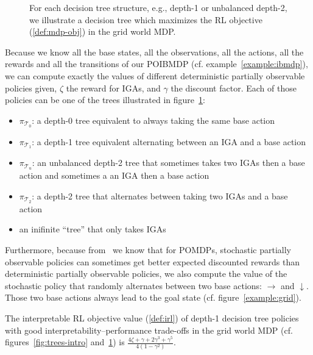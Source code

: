 \begin{figure}
    \caption{For each decision tree structure, e.g., depth-1 or unbalanced depth-2, we illustrate a decision tree which maximizes the RL objective (\ref{def:mdp-obj}) in the grid world MDP.}
    \label{fig:optimal-policy-trees}
\end{figure}

Because we know all the base states, all the observations, all the actions, all the rewards and all the transitions of our POIBMDP (cf. example~\ref{example:ibmdp}), we can compute exactly the values of different deterministic partially observable policies given, $\zeta$ the reward for IGAs, and $\gamma$ the discount factor.
Each of those policies can be one of the trees illustrated in figure~\ref{fig:optimal-policy-trees}: 

\begin{itemize}
    \item $\pi_{\mathcal{T}_0}$: a depth-0 tree equivalent to always taking the same base action 
    \item $\pi_{\mathcal{T}_1}$: a depth-1 tree equivalent alternating between an IGA and a base action 
    \item $\pi_{\mathcal{T}_u}$: an unbalanced depth-2 tree that sometimes takes two IGAs then a base action and sometimes a an IGA then a base action
    \item $\pi_{\mathcal{T}_2}$: a depth-2 tree that alternates between taking two IGAs and a base action
    \item an inifinite ``tree'' that only takes IGAs
\end{itemize}
Furthermore, because from~\cite{learning-pomdp} we know that for POMDPs, stochastic partially observable policies can sometimes get better expected discounted rewards than deterministic partially observable policies, we also compute the value of the stochastic policy that randomly alternates between two base actions: $\rightarrow$ and $\downarrow$.
Those two base actions always lead to the goal state (cf. figure~\ref{example:grid}).

\begin{proposition} The interpretable RL objective value (\ref{def:irl}) of depth-1 decision tree policies with good interpretability–performance trade-offs in the grid world MDP (cf. figures~\ref{fig:trees-intro} and~\ref{fig:optimal-policy-trees}) is $\frac{4\zeta + \gamma + 2\gamma^3 + \gamma^5}{4(1-\gamma^2)}$.
\end{proposition}

